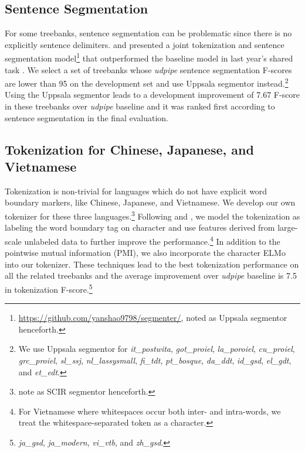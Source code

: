 \documentclass[11pt,a4paper]{article}
\begin{document}
\subsection{Sentence Segmentation}
For some treebanks, sentence segmentation can be problematic
since there is no explicitly sentence delimiters.
\citet{delhoneux-EtAl:2017:K17-3} and \citet{DBLP:journals/corr/abs-1709-03756}
presented a joint tokenization and
sentence segmentation model\footnote{\url{https://github.com/yanshao9798/segmenter/}, noted as Uppsala segmentor henceforth.}
that outperformed the baseline model in last year's shared task \cite{udst:overview2017}.
We select a set of treebanks whose \textit{udpipe} sentence segmentation F-scores
are lower than 95 on the development set and use Uppsala segmentor instead.\footnote{We
	use Uppsala segmentor for \textit{it\_postwita}, \textit{got\_proiel}, \textit{la\_poroiel}, \textit{cu\_proiel},
	\textit{grc\_proiel}, \textit{sl\_ssj}, \textit{nl\_lassysmall}, \textit{fi\_tdt}, \textit{pt\_bosque}, \textit{da\_ddt}, \textit{id\_gsd},
	\textit{el\_gdt}, and \textit{et\_edt}.}
Using the Uppsala segmentor leads to a development improvement of 
7.67 F-score in these treebanks over \textit{udpipe} baseline
and it was ranked first according to sentence segmentation
in the final evaluation.

\subsection{Tokenization for Chinese, Japanese, and Vietnamese}

Tokenization is non-trivial for languages 
which do not have explicit word boundary markers, like Chinese, Japanese, and Vietnamese.
We develop our own tokenizer for these three languages.\footnote{note as SCIR segmentor henceforth.}
Following \citet{che-EtAl:2017:K17-3} and \citet{10.1007/978-3-319-69005-6_6}, we model the tokenization as labeling the
word boundary tag on character and 
use features derived from large-scale unlabeled data to further improve the performance.\footnote{For Vietnamese where whitespaces occur both inter- and intra-words, we treat the whitespace-separated token as a character.}
In addition to the pointwise mutual information (PMI), we also incorporate
the character ELMo into our tokenizer.
These techniques lead to the best tokenization performance on all the related treebanks
and the average improvement over \textit{udpipe} baseline is 7.5 in tokenization F-score.\footnote{\textit{ja\_gsd}, \textit{ja\_modern}, \textit{vi\_vtb}, and \textit{zh\_gsd}.}
\end{document}
